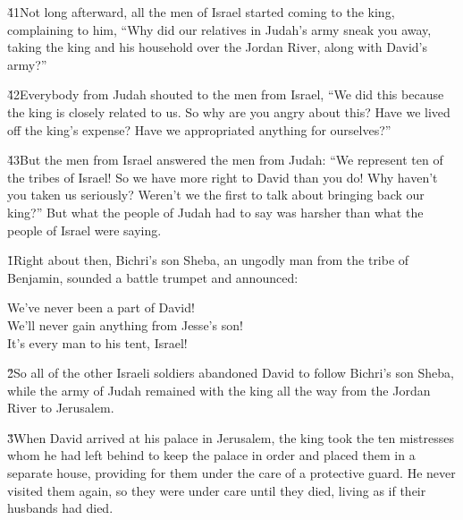 \v{41}Not long afterward, all the men of Israel started coming to the king, complaining to him, ``Why did our relatives in Judah's army sneak you away, taking the king and his household over the Jordan River, along with David's army?''

\v{42}Everybody from Judah shouted to the men from Israel, ``We did this because the king is closely related to us. So why are you angry about this? Have we lived off the king's expense? Have we appropriated anything for ourselves?''

\v{43}But the men from Israel answered the men from Judah: ``We represent ten of the tribes of Israel! So we have more right to David than you do! Why haven't you taken us seriously? Weren't we the first to talk about bringing back our king?'' But what the people of Judah had to say was harsher than what the people of Israel were saying.

\v{1}Right about then, Bichri's son Sheba, an ungodly man from the tribe of Benjamin, sounded a battle trumpet and announced:

\begin{poetry}
\poeml We've never been a part of David! \\
\poemll    We'll never gain anything from Jesse's son! \\
\poemlll       It's every man to his tent, Israel!
\end{poetry}

\v{2}So all of the other Israeli soldiers abandoned David to follow Bichri's son Sheba, while the army of Judah remained with the king all the way from the Jordan River to Jerusalem.

\v{3}When David arrived at his palace in Jerusalem, the king took the ten mistresses whom he had left behind to keep the palace in order and placed them in a separate house, providing for them under the care of a protective guard. He never visited them again, so they were under care until they died, living as if their husbands had died.

